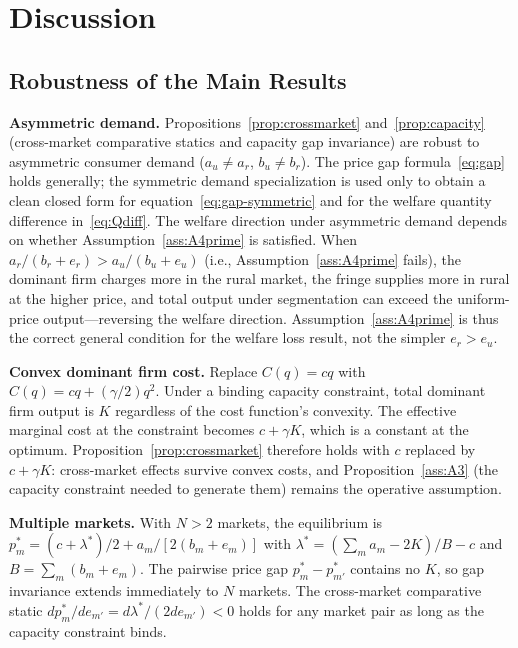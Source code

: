 \documentclass[12pt]{article}
\theoremstyle{plain}
\theoremstyle{definition}
\theoremstyle{remark}
\begin{document}
\section{Discussion}
\label{sec:discussion}

\subsection{Robustness of the Main Results}

\textbf{Asymmetric demand.}  Propositions~\ref{prop:crossmarket}
and~\ref{prop:capacity} (cross-market comparative statics and capacity gap
invariance) are robust to asymmetric consumer demand ($a_u \neq a_r$, $b_u \neq b_r$).
The price gap formula~\eqref{eq:gap} holds generally; the symmetric demand
specialization is used only to obtain a clean closed form for
equation~\eqref{eq:gap-symmetric} and for the welfare quantity difference
in~\eqref{eq:Qdiff}.  The welfare direction under asymmetric demand depends
on whether Assumption~\ref{ass:A4prime} is satisfied.  When $a_r/(b_r + e_r) > a_u/(b_u + e_u)$
(i.e., Assumption~\ref{ass:A4prime} fails), the dominant firm charges more in
the rural market, the fringe supplies more in rural at the higher price, and
total output under segmentation can exceed the uniform-price output---reversing
the welfare direction.  Assumption~\ref{ass:A4prime} is thus the correct
general condition for the welfare loss result, not the simpler $e_r > e_u$.

\textbf{Convex dominant firm cost.}  Replace $C(q) = cq$ with
$C(q) = cq + (\gamma/2)q^2$.  Under a binding capacity constraint, total
dominant firm output is $K$ regardless of the cost function's convexity.
The effective marginal cost at the constraint becomes $c + \gamma K$, which
is a constant at the optimum.  Proposition~\ref{prop:crossmarket} therefore
holds with $c$ replaced by $c + \gamma K$: cross-market effects survive
convex costs, and Proposition~\ref{ass:A3} (the capacity constraint needed
to generate them) remains the operative assumption.

\textbf{Multiple markets.}  With $N > 2$ markets, the equilibrium is
$p_m^* = (c + \lambda^*)/2 + a_m/[2(b_m + e_m)]$ with $\lambda^* = (\sum_m a_m - 2K)/B - c$
and $B = \sum_m (b_m + e_m)$.  The pairwise price gap
$p_m^* - p_{m'}^*$ contains no $K$, so gap invariance extends immediately to
$N$ markets.  The cross-market comparative static $dp_m^*/de_{m'} = d\lambda^*/(2de_{m'}) < 0$
holds for any market pair as long as the capacity constraint binds.
\end{document}

